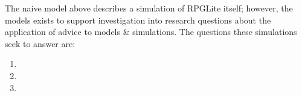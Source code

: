 
The naive model above describes a simulation of RPGLite itself; however, the
models exists to support investigation into research questions about the
application of advice to models \& simulations. The questions these simulations
seek to answer are:

\begin{enumerate}
  \item \rqtwo{}
  \item \rqthree{}
  \item \rqfour{}
\end{enumerate}


